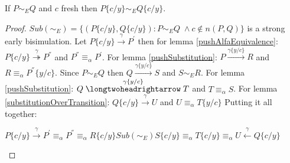 \begin{lemma}\label{freshSubstitutionPreservesEarlyBisimulation}
  If $P \sim_{E} Q$ and $c$ fresh then $P\{c/y\} \sim_{E} Q\{c/y\}$.
  \begin{proof}
    $Sub(\sim_{E})=\{(P\{c/y\}, Q\{c/y\}): P\sim_{E}Q\; \wedge c\notin n(P,Q)\}$ is a strong early bisimulation. Let $P\{c/y\} \xrightarrow{\gamma} P^{'}$ then for lemma \ref{pushAlfaEquivalence}: $P\{c/y\} \stackrel{\gamma}{\twoheadrightarrow} P^{''}$ and $P^{''}\equiv_{\alpha}P^{'}$. For lemma \ref{pushSubstitution}: $P \xrightarrow{\gamma \{y/c\}} R$ and $R\equiv_{\alpha}P^{''}\{y/c\}$. Since $P\sim_{E}Q$ then $Q \xrightarrow{\gamma \{y/c\}} S$ and $S\sim_{E} R$. For lemma \ref{pushSubstitution}: $Q \stackrel{\gamma \{y/c\}}{\longtwoheadrightarrow} T$ and $T\equiv_{\alpha}S$. For lemma \ref{substitutionOverTransition}: $Q\{c/y\} \xrightarrow{\gamma} U$ and $U \equiv_{\alpha} T\{y/c\}$ Putting it all together:
    \begin{center}
      $P\{c/y\} \xrightarrow{\gamma} P^{'} \equiv_{\alpha} P^{''} \equiv_{\alpha} R\{c/y\} Sub(\sim_{E}) S\{c/y\} \equiv_{\alpha} T\{c/y\} \equiv_{\alpha} U \stackrel{\gamma}{\leftarrow} Q\{c/y\}$
    \end{center}
  \end{proof}
\end{lemma}



